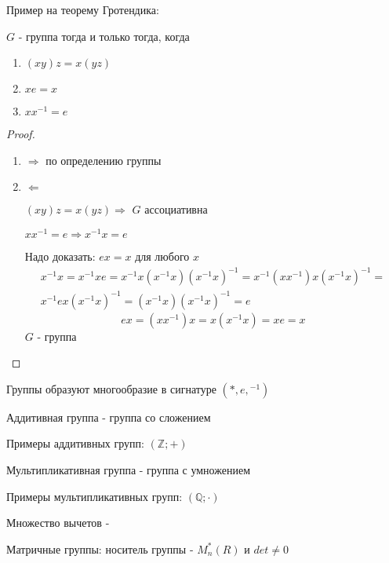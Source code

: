 \documentclass[../main/document.tex]{subfiles}
\begin{document}
\begin{exm}
Пример на теорему Гротендика:
\end{exm}
\begin{thm}\label{group-qualities}
$G$ - группа тогда и только тогда, когда
\begin{enumerate}
\item $(xy)z=x(yz)$
\item $xe=x$
\item $xx^{-1}=e$
\end{enumerate}
\begin{proof}
\begin{enumerate}
\item $\Rightarrow$ по определению группы
\item $\Leftarrow$

$(xy)z=x(yz)\Rightarrow$ $G$ ассоциативна

$xx^{-1}=e\Rightarrow x^{-1}x=e$

Надо доказать: $ex=x$ для любого $x$
\begin{multline}
x^{-1}x=x^{-1}xe=x^{-1}x(x^{-1}x)(x^{-1}x)^{-1}=x^{-1}(xx^{-1})x(x^{-1}x)^{-1}=\\
x^{-1}ex(x^{-1}x)^{-1}=(x^{-1}x)(x^{-1}x)^{-1}=e
\end{multline}
$$ex=(xx^{-1})x=x(x^{-1}x)=xe=x$$
$G$ - группа
\end{enumerate}
\end{proof}
\end{thm}
\begin{cnsq}
Группы образуют многообразие в сигнатуре $(*,e,{ }^{-1})$
\end{cnsq}
\begin{dfn}
Аддитивная группа - группа со сложением
\end{dfn}
\begin{exm}
Примеры аддитивных групп:
$(\mathbb{Z};+)$
\end{exm}
\begin{dfn}
Мультипликативная группа - группа с умножением
\end{dfn}
\begin{exm}
Примеры мультипликативных групп:
$(\mathbb{Q};\cdot)$
\end{exm}
\begin{dfn}
Множество вычетов - 
\end{dfn}
\begin{exm}
\end{exm}
\begin{dfn}
Матричные группы: носитель группы - $M^*_n(R)$ и $det\neq 0$
\end{dfn}
\end{document}
